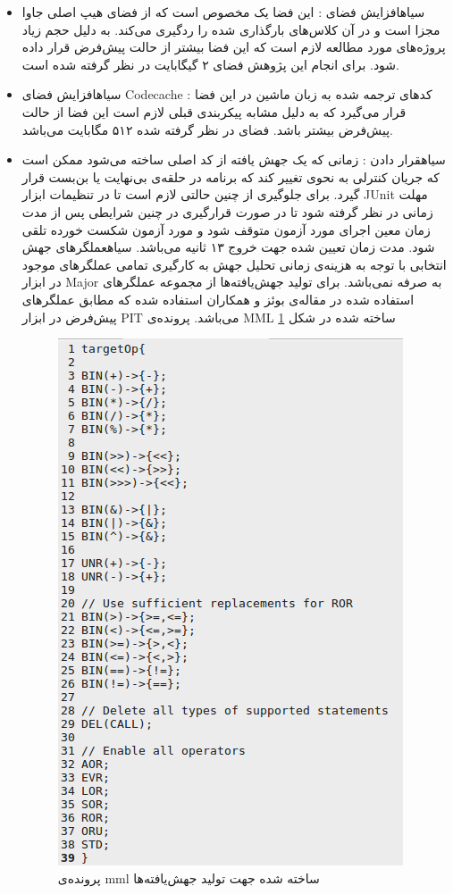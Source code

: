 \begin{itemize}
	 \setlength{\itemsep}{1pt}
	\setlength{\parskip}{0pt}
	\setlength{\parsep}{0pt}

\item 
{}‌سیاه{افزایش فضای :}  
این فضا  یک  مخصوص است که از فضای هیپ اصلی جاوا مجزا است و در آن   کلاس‌های بارگذاری شده را ردگیری می‌کند. به دلیل حجم زیاد پروژه‌های مورد مطالعه لازم است که این فضا بیشتر از حالت پیش‌فرض قرار داده شود. برای انجام این پژوهش فضای ۲ گیگابایت در نظر گرفته شده است. 
\item
{}‌سیاه{افزایش فضای Codecache :} 
کدهای ترجمه شده به زبان ماشین در این فضا قرار می‌گیرد که به دلیل مشابه پیکربندی قبلی لازم است این فضا از حالت پیش‌فرض بیشتر باشد. فضای در نظر گرفته شده ۵۱۲ مگابایت می‌باشد. 
\item
{}‌سیاه{قرار دادن  :}
زمانی که یک جهش یافته از کد اصلی ساخته می‌شود ممکن است که جریان کنترلی به نحوی تغییر کند که برنامه در حلقه‌ی بی‌نهایت یا بن‌بست قرار گیرد. برای جلوگیری از چنین حالتی لازم است تا در تنظیمات ابزار JUnit  مهلت زمانی در نظر گرفته شود تا در صورت قرارگیری در چنین شرایطی پس از مدت زمان معین اجرای مورد آزمون متوقف شود و مورد آزمون شکست خورده تلقی شود. مدت زمان تعیین شده جهت خروج ۱۳ ثانیه می‌باشد. 
‌سیاه{عملگرهای جهش انتخابی}
با توجه به هزینه‌ی زمانی تحلیل جهش به کارگیری تمامی عملگرهای موجود در ابزار Major به صرفه نمی‌باشد. برای تولید جهش‌یافته‌ها از مجموعه عملگرهای استفاده شده در مقاله‌ی بوئز و همکاران\cite{bowes2016mutation} استفاده شده که مطابق عملگرهای پیش‌فرض در ابزار   PIT‌ می‌باشد. پرونده‌ی MML ساخته شده در شکل \ref{fig:mml-used}

\begin{figure}[H]
	\centering
	\includegraphics[width=.7\textwidth]{img/case_study/mml-used.png}
	\caption{پرونده‌ی mml ساخته شده جهت تولید جهش‌یافته‌ها}
	\label{fig:mml-used}
\end{figure}
\end{itemize}
